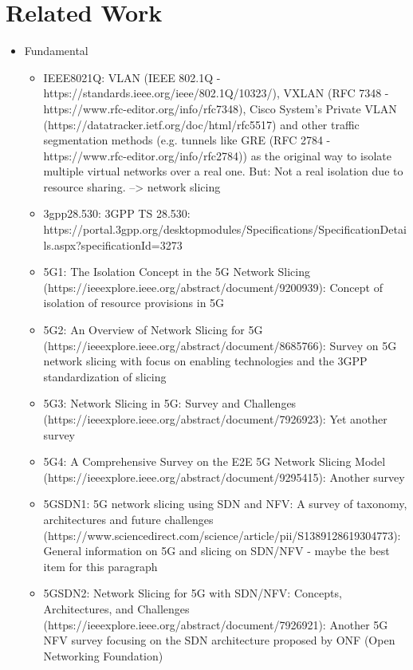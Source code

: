\chapter{Related Work}
\label{related_work}
\iffalse
\begin{itemize}
    \item Fundamental
    \begin{itemize}
        \item IEEE8021Q: VLAN (IEEE 802.1Q - https://standards.ieee.org/ieee/802.1Q/10323/), VXLAN (RFC 7348 - https://www.rfc-editor.org/info/rfc7348), Cisco System's Private VLAN (https://datatracker.ietf.org/doc/html/rfc5517) and other traffic segmentation methods (e.g. tunnels like GRE (RFC 2784 - https://www.rfc-editor.org/info/rfc2784)) as the original way to isolate multiple virtual networks over a real one. But: Not a real isolation due to resource sharing. --> network slicing
        \item 3gpp28.530: 3GPP TS 28.530: https://portal.3gpp.org/desktopmodules/Specifications/SpecificationDetails.aspx?specificationId=3273
        \item 5G1: The Isolation Concept in the 5G Network Slicing (https://ieeexplore.ieee.org/abstract/document/9200939): Concept of isolation of resource provisions in 5G
        \item 5G2: An Overview of Network Slicing for 5G (https://ieeexplore.ieee.org/abstract/document/8685766): Survey on 5G network slicing with focus on enabling technologies and the 3GPP standardization of slicing
        \item 5G3: Network Slicing in 5G: Survey and Challenges (https://ieeexplore.ieee.org/abstract/document/7926923): Yet another survey
        \item 5G4: A Comprehensive Survey on the E2E 5G Network Slicing Model (https://ieeexplore.ieee.org/abstract/document/9295415): Another survey
        \item 5GSDN1: 5G network slicing using SDN and NFV: A survey of taxonomy, architectures and future challenges (https://www.sciencedirect.com/science/article/pii/S1389128619304773): General information on 5G and slicing on SDN/NFV - maybe the best item for this paragraph
        \item 5GSDN2: Network Slicing for 5G with SDN/NFV: Concepts, Architectures, and Challenges (https://ieeexplore.ieee.org/abstract/document/7926921): Another 5G NFV survey focusing on the SDN architecture proposed by ONF (Open Networking Foundation)
    \end{itemize}

\end{itemize}
